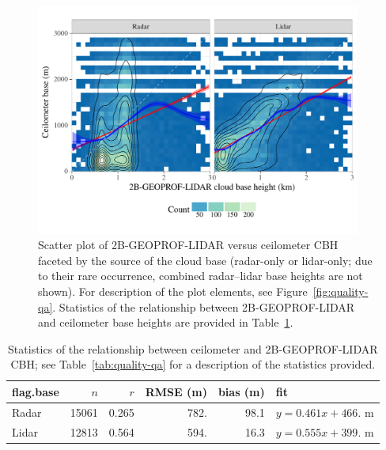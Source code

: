 \documentclass[essd,manuscript]{copernicus}\usepackage[]{graphicx}\usepackage[]{color}
\newenvironment{knitrout}{}{} %
\begin{document}
\begin{figure}
  \centering

\begin{knitrout}
\color{fgcolor}

{\centering \includegraphics[width=0.95\textwidth]{figure/method-eval-2bgeoprof-1} 

}



\end{knitrout}
  \caption{Scatter plot of 2B-GEOPROF-LIDAR versus ceilometer CBH
    faceted by the source of the cloud base (radar-only or lidar-only; due to
    their rare occurrence, combined radar--lidar base heights are not shown).
    For description of the plot elements, see Figure~\ref{fig:quality-qa}.  Statistics of the
    relationship between 2B-GEOPROF-LIDAR and ceilometer base heights are provided in
    Table~\ref{tab:2bgeoprof}.}
  \label{fig:eval-2b}
\end{figure}

\begin{table}
  \caption{Statistics of the relationship between ceilometer and
    2B-GEOPROF-LIDAR CBH; see Table~\ref{tab:quality-qa} for a
    description of the statistics provided.}
  \label{tab:2bgeoprof}
  \centering
\begin{tabular}{lrrrrl}
  \hline
\hline
flag.base & $n$ & $r$ & RMSE (m) & bias (m) & fit \\ 
  \hline
Radar & 15061 & 0.265 & 782. & 98.1 & $y = 0.461 x + 466.$ m \\ 
  Lidar & 12813 & 0.564 & 594. & 16.3 & $y = 0.555 x + 399.$ m \\ 
   \hline
\hline
\end{tabular}

\end{table}
\end{document}
